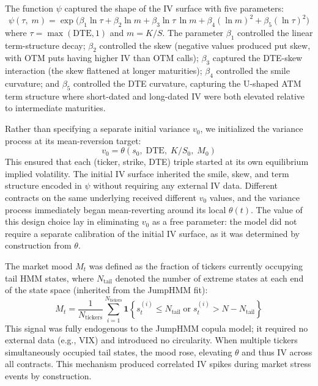The function $\psi$ captured the shape of the IV surface with five parameters:\label{sec:psi}
\begin{equation}\label{eq:psi}
    \psi(\tau,\; m) = \exp\!\Big(\beta_1 \ln\tau + \beta_2 \ln m + \beta_3 \ln\tau\,\ln m + \beta_4 (\ln m)^2 + \beta_5 (\ln\tau)^2\Big)
\end{equation}
where $\tau = \max(\mathrm{DTE}, 1)$ and $m = K/S$. The parameter $\beta_1$ controlled the linear term-structure decay; $\beta_2$ controlled the skew (negative values produced put skew, with OTM puts having higher IV than OTM calls); $\beta_3$ captured the DTE-skew interaction (the skew flattened at longer maturities); $\beta_4$ controlled the smile curvature; and $\beta_5$ controlled the DTE curvature, capturing the U-shaped ATM term structure where short-dated and long-dated IV were both elevated relative to intermediate maturities.

Rather than specifying a separate initial variance $v_0$, we initialized the variance process at its mean-reversion target:\label{sec:initialization}
\begin{equation}\label{eq:v0}
    v_0 = \theta(s_0,\; \mathrm{DTE},\; K/S_0,\; M_0)
\end{equation}
This ensured that each (ticker, strike, DTE) triple started at its own equilibrium implied volatility. The initial IV surface inherited the smile, skew, and term structure encoded in $\psi$ without requiring any external IV data. Different contracts on the same underlying received different $v_0$ values, and the variance process immediately began mean-reverting around its local $\theta(t)$. The value of this design choice lay in eliminating $v_0$ as a free parameter: the model did not require a separate calibration of the initial IV surface, as it was determined by construction from $\theta$.

The market mood $M_t$ was defined as the fraction of tickers currently occupying tail HMM states, where $N_{\text{tail}}$ denoted the number of extreme states at each end of the state space (inherited from the JumpHMM fit):\label{sec:mood}
\begin{equation}\label{eq:mood}
    M_t = \frac{1}{N_{\text{tickers}}} \sum_{i=1}^{N_{\text{tickers}}} \mathbf{1}\!\left\{s_t^{(i)} \leq N_{\text{tail}} \;\text{or}\; s_t^{(i)} > N - N_{\text{tail}}\right\}
\end{equation}
This signal was fully endogenous to the JumpHMM copula model; it required no external data (e.g., VIX) and introduced no circularity. When multiple tickers simultaneously occupied tail states, the mood rose, elevating $\theta$ and thus IV across all contracts. This mechanism produced correlated IV spikes during market stress events by construction.

